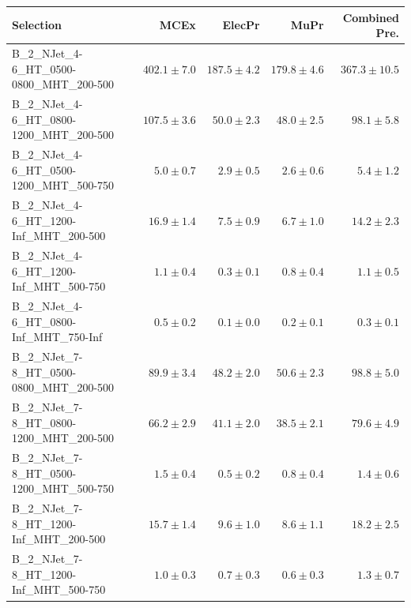 \documentclass{beamer}
\begin{document}
\begin{frame}
\tiny
\begin{tabular}{lrrrr}
\toprule

                                                Selection  &                     MCEx  &           ElecPr  &             MuPr  &          Combined Pre.  \\ 
\midrule
     B\_2\_NJet\_4-6\_HT\_0500-0800\_MHT\_200-500 &             $402.1\pm7.0$&             $187.5\pm4.2$&             $179.8\pm4.6$&                $367.3\pm10.5$ \\ 
     B\_2\_NJet\_4-6\_HT\_0800-1200\_MHT\_200-500 &             $107.5\pm3.6$&              $50.0\pm2.3$&              $48.0\pm2.5$&                  $98.1\pm5.8$ \\ 
     B\_2\_NJet\_4-6\_HT\_0500-1200\_MHT\_500-750 &               $5.0\pm0.7$&               $2.9\pm0.5$&               $2.6\pm0.6$&                   $5.4\pm1.2$ \\ 
      B\_2\_NJet\_4-6\_HT\_1200-Inf\_MHT\_200-500 &              $16.9\pm1.4$&               $7.5\pm0.9$&               $6.7\pm1.0$&                  $14.2\pm2.3$ \\ 
      B\_2\_NJet\_4-6\_HT\_1200-Inf\_MHT\_500-750 &               $1.1\pm0.4$&               $0.3\pm0.1$&               $0.8\pm0.4$&                   $1.1\pm0.5$ \\ 
      B\_2\_NJet\_4-6\_HT\_0800-Inf\_MHT\_750-Inf &               $0.5\pm0.2$&               $0.1\pm0.0$&               $0.2\pm0.1$&                   $0.3\pm0.1$ \\ 
     B\_2\_NJet\_7-8\_HT\_0500-0800\_MHT\_200-500 &              $89.9\pm3.4$&              $48.2\pm2.0$&              $50.6\pm2.3$&                  $98.8\pm5.0$ \\ 
     B\_2\_NJet\_7-8\_HT\_0800-1200\_MHT\_200-500 &              $66.2\pm2.9$&              $41.1\pm2.0$&              $38.5\pm2.1$&                  $79.6\pm4.9$ \\ 
     B\_2\_NJet\_7-8\_HT\_0500-1200\_MHT\_500-750 &               $1.5\pm0.4$&               $0.5\pm0.2$&               $0.8\pm0.4$&                   $1.4\pm0.6$ \\ 
      B\_2\_NJet\_7-8\_HT\_1200-Inf\_MHT\_200-500 &              $15.7\pm1.4$&               $9.6\pm1.0$&               $8.6\pm1.1$&                  $18.2\pm2.5$ \\ 
      B\_2\_NJet\_7-8\_HT\_1200-Inf\_MHT\_500-750 &               $1.0\pm0.3$&               $0.7\pm0.3$&               $0.6\pm0.3$&                   $1.3\pm0.7$ \\ 

\end{tabular}
\end{frame}
\end{document}
